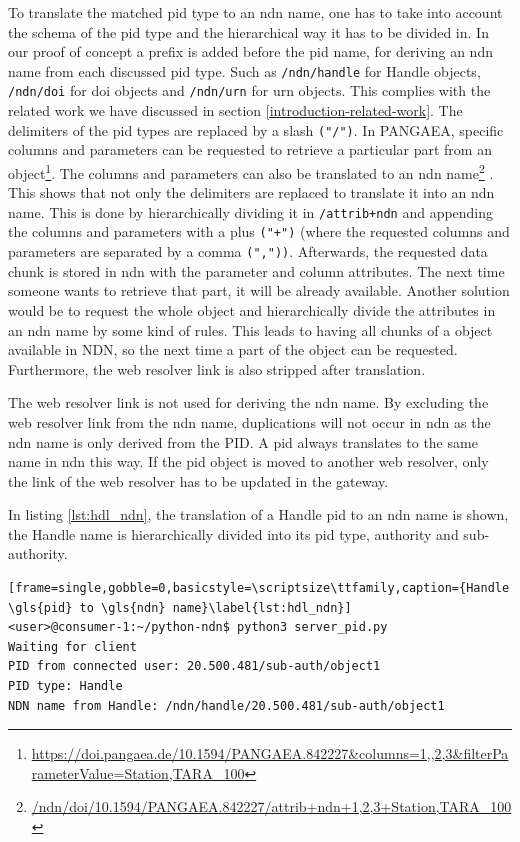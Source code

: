 To translate the matched \gls{pid} type to an \gls{ndn} name, one has to take into account the schema of the \gls{pid} type and the hierarchical way it has to be divided in. In our proof of concept a prefix is added before the \gls{pid} name, for deriving an \gls{ndn} name from each discussed \gls{pid} type. Such as \texttt{/ndn/handle} for Handle objects, \texttt{/ndn/doi} for \gls{doi} objects and \texttt{/ndn/urn} for \gls{urn} objects. This complies with the related work we have discussed in section \ref{introduction-related-work}. The delimiters of the \gls{pid} types are replaced by a slash \texttt{("/")}. In PANGAEA, specific columns and parameters can be requested to retrieve a particular part from an object\footnote{\url{https://doi.pangaea.de/10.1594/PANGAEA.842227&columns=1,,2,3&filterParameterValue=Station,TARA_100}}. The columns and parameters can also be translated to an \gls{ndn} name\footnote{\url{/ndn/doi/10.1594/PANGAEA.842227/attrib+ndn+1,2,3+Station,TARA_100}} \cite{ndn-app-aware}. This shows that not only the delimiters are replaced to translate it into an \gls{ndn} name. This is done by hierarchically dividing it in \texttt{/attrib+ndn} and appending the columns and parameters with a plus \texttt{("+")} (where the requested columns and parameters are separated by a comma \texttt{(","))}. 
Afterwards, the requested data chunk is stored in \gls{ndn} with the parameter and column attributes. The next time someone wants to retrieve that part, it will be already available. Another solution would be to request the whole object and hierarchically divide the attributes in an \gls{ndn} name by some kind of rules. This leads to having all chunks of a object available in NDN, so the next time a part of the object can be requested.
Furthermore, the web resolver link is also stripped after translation.

The web resolver link is not used for deriving the \gls{ndn} name.
By excluding the web resolver link from the \gls{ndn} name, duplications will not occur in \gls{ndn} as the \gls{ndn} name is only derived from the PID. A \gls{pid} always translates to the same name in \gls{ndn} this way. 
If the \gls{pid} object is moved to another web resolver, only the link of the web resolver has to be updated in the gateway. 

In listing \ref{lst:hdl_ndn}, the translation of a Handle \gls{pid} to an \gls{ndn} name is shown, the Handle name is hierarchically divided into its \gls{pid} type, authority and sub-authority.
\vspace{1em}
\begin{lstlisting}[frame=single,gobble=0,basicstyle=\scriptsize\ttfamily,caption={Handle \gls{pid} to \gls{ndn} name}\label{lst:hdl_ndn}]
<user>@consumer-1:~/python-ndn$ python3 server_pid.py
Waiting for client
PID from connected user: 20.500.481/sub-auth/object1
PID type: Handle
NDN name from Handle: /ndn/handle/20.500.481/sub-auth/object1
\end{lstlisting}


